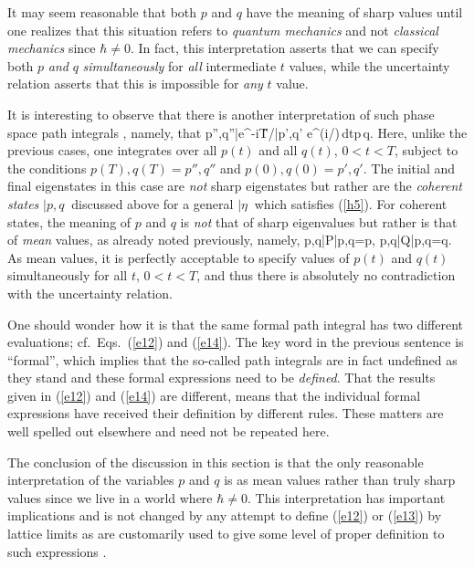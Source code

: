 It may seem reasonable that both $p$ and $q$ have the meaning of sharp 
values until one realizes that this situation refers to 
{\it quantum mechanics} and not {\it classical mechanics} since 
$\hbar\not=0$. In fact, this interpretation asserts that we can specify 
both $p$ {\it and} $q$ {\it simultaneously} for {\it all} intermediate 
$t$ values, while the uncertainty relation asserts that this is impossible 
for {\it any} $t$ value. 

It is interesting to observe that there is another interpretation of 
such phase space path integrals \cite{kla60,klabs}, namely, that
  \bn \<p'',q''|\s e^{-i\H T/\hbar}\s|p',q'\>\int 
e^{(i/\hbar)\tint[p\s{\dot q}-H(p,q)]\,dt}\;\D p\,\D q\;.   \label{e14}\en
Here, unlike the previous cases, one integrates over all $p(t)$ and all 
$q(t)$,
$0<t<T$, subject to the conditions $p(T),q(T)=p'',q''$ and $p(0),q(0)=p',q'$.
The initial and final eigenstates in this case are {\it not} sharp 
eigenstates but rather are the {\it coherent states} $|p,q\>$ discussed 
above for a general $|\eta\>$ which satisfies (\ref{h5}). For coherent 
states, the meaning of $p$ and $q$ is {\it not} that of sharp eigenvalues 
but rather is that of {\it mean} values, as already noted previously, 
namely,
  \bn  \<p,q|P|p,q\>=p\;,\hskip1cm \<p,q|Q|p,q\>=q\;. \en
As mean values, it is perfectly acceptable to specify values of $p(t)$ 
and $q(t)$ simultaneously for all $t$, $0<t<T$, and thus there is absolutely 
no contradiction with the uncertainty relation.

One should wonder how it is that the same formal path integral has two 
different evaluations; cf.~Eqs.~(\ref{e12}) and (\ref{e14}). The key word 
in the previous sentence is ``formal'', which implies that the so-called 
path integrals are in fact undefined as they stand and these formal 
expressions need to be {\it defined}. That the results given in 
(\ref{e12}) and (\ref{e14}) are different, means that the individual 
formal expressions have received their definition by different rules. 
These matters are well spelled out elsewhere \cite{kla13} and need not be 
repeated here.

The conclusion of the discussion in this section is that the only 
reasonable interpretation of the variables $p$ and $q$ is as mean values 
rather than truly sharp values since we live in a world where 
$\hbar\not=0$. This interpretation has important implications and is 
not changed by any attempt to define (\ref{e12}) or (\ref{e13}) by 
lattice limits as are customarily used to give some level of proper 
definition to such expressions \cite{swe}. 

